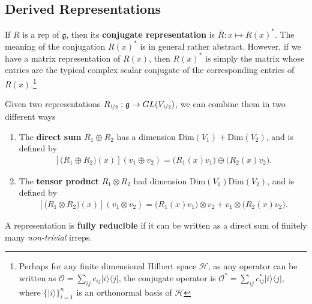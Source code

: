 \documentclass[11pt,fleqn]{article}
\begin{document}
\subsection{Derived Representations}

\begin{definition}
	If $R$ is a rep of $\mathfrak{g}$, then its \textbf{conjugate representation} is $\bar{R} : x \mapsto R(x)^*$. The meaning of the conjugation $R(x)^*$ is in general rather abstract. However, if we have a matrix representation of $R(x)$, then $R(x)^*$ is simply the matrix whose entries are the typical complex scalar conjugate of the corresponding entries of $R(x)$.\footnote{Perhaps for any finite dimensional Hilbert space $\mathcal{H}$, as any operator can be written as $\mathcal{O} = \sum_{ij} c_{ij} |i\rangle \langle j |$, the conjugate operator is $\mathcal{O}^* = \sum_{ij} c_{ij}^* |i\rangle \langle j |$, where $\{|i\rangle\}_{i=1}^n$ is an orthonormal basis of $\mathcal{H}$}
\end{definition}

\begin{definition}
	Given two representations $R_{\nicefrac{1}{2}} : \mathfrak{g} \to GL(V_{\nicefrac{1}{2}})$, we can combine them in two different ways
		\begin{enumerate}
			\item The \textbf{direct sum} $R_1 \oplus R_2$ has a dimension $\text{Dim}(V_1) + \text{Dim}(V_2)$, and is defined by
				\begin{align}
					\left[\big( R_1 \oplus R_2 \big)(x)\right]  (v_1 \oplus v_2) = \big(R_1(x) v_1 \big) \oplus \big( R_2(x) v_2 \big).
				\end{align}
			\item The \textbf{tensor product} $R_1 \otimes R_2$ had dimension $\text{Dim}(V_1)\text{Dim}(V_2)$, and is defined by
				\begin{align}
					\left[\big( R_1 \otimes R_2 \big)(x)\right]  (v_1 \otimes v_2) = \big( R_1(x) v_1 \big) \otimes v_2 + v_1 \otimes \big( R_2(x) v_2 \big).
				\end{align}
		\end{enumerate}
\end{definition}

\begin{definition}
	A representation is \textbf{fully reducible} if it can be written as a direct sum of finitely many \textit{non-trivial} irreps.
\end{definition}
\end{document}
